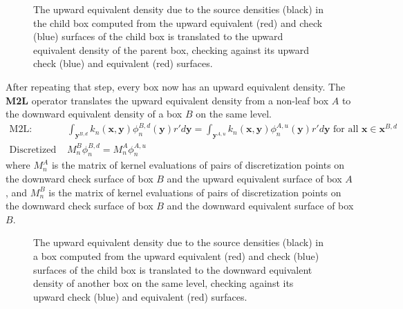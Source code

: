 \documentclass[11pt, oneside]{article}   	%
\begin{document}
\begin{figure}[!ht]
\begin{center}
\end{center}
\caption{The upward equivalent density due to the source densities (black) in the child box computed from the upward equivalent (red) and check (blue) surfaces of the child box is translated to the upward equivalent density of the parent box, checking against its upward check (blue) and equivalent (red) surfaces.}
\end{figure}

After repeating that step, every box now has an upward equivalent density. The \textbf{M2L} operator translates the upward equivalent density from a non-leaf box $A$ to the downward equivalent density of a box $B$ on the same level.
\begin{align}
\mbox{M2L: }&\int_{\mathbf{y}^{B,d}}{k_n(\mathbf{x},\mathbf{y})}\phi^{B,d}_n{(\mathbf{y})}r'd\mathbf{y} = \int_{\mathbf{y}^{A,u}}{k_n(\mathbf{x},\mathbf{y})}\phi^{A,u}_n{(\mathbf{y})}r'd\mathbf{y}\mbox{ for all }\mathbf{x}\in\mathbf{x}^{B,d}\\
\mbox{Discretized M2L: }&M_n^B\phi^{B,d}_n=M_n^A\phi^{A,u}_n
\end{align}
where $M_n^A$ is the matrix of kernel evaluations of pairs of discretization points on the downward check surface of box $B$ and the upward equivalent surface of box $A$, and $M_n^B$ is the matrix of kernel evaluations of pairs of discretization points on the downward check surface of box $B$ and the downward equivalent surface of box $B$.

\begin{figure}[!ht]
\begin{center}
\end{center}
\caption{The upward equivalent density due to the source densities (black) in a box computed from the upward equivalent (red) and check (blue) surfaces of the child box is translated to the downward equivalent density of another box on the same level, checking against its upward check (blue) and equivalent (red) surfaces.}
\end{figure}
\end{document}
